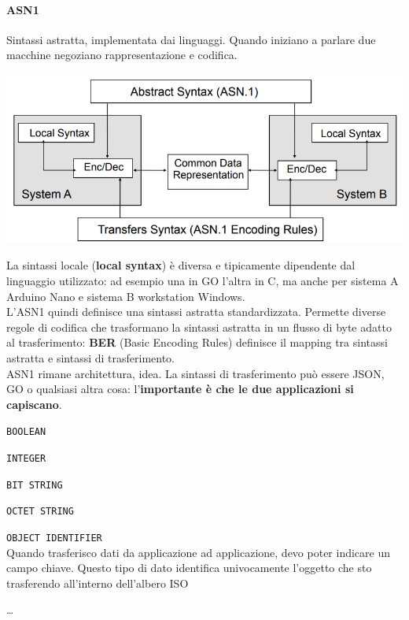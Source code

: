 \documentclass[10pt]{book}
\begin{document}
\paragraph{ASN1} Sintassi astratta, implementata dai linguaggi. Quando iniziano a parlare due macchine negoziano rappresentazione e codifica.
\begin{center}
	\includegraphics[scale=0.7]{asn1.png}
\end{center}
La sintassi locale (\textbf{local syntax}) è diversa e tipicamente dipendente dal linguaggio utilizzato: ad esempio una in GO l'altra in C, ma anche per sistema A Arduino Nano e sistema B workstation Windows.\\
L'ASN1 quindi definisce una sintassi astratta standardizzata. Permette diverse regole di codifica che trasformano la sintassi astratta in un flusso di byte adatto al trasferimento: \textbf{BER} (Basic Encoding Rules) definisce il mapping tra sintassi astratta e sintassi di trasferimento.\\
ASN1 rimane architettura, idea. La sintassi di trasferimento può essere JSON, GO o qualsiasi altra cosa: l'\textbf{importante è che le due applicazioni si capiscano}.
\begin{list}{}{I \textbf{tipi di dato} (datatypes) primitivi dell'ASN1 sono:}
	\item \texttt{BOOLEAN}
	\item \texttt{INTEGER}
	\item \texttt{BIT STRING}
	\item \texttt{OCTET STRING}
	\item \texttt{OBJECT IDENTIFIER}\\
	Quando trasferisco dati da applicazione ad applicazione, devo poter indicare un campo chiave. Questo tipo di dato identifica univocamente l'oggetto che sto trasferendo all'interno dell'albero ISO
	\item \ldots
\end{list}
\pagebreak
\end{document}
